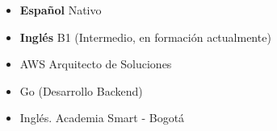 %
%
%

\twocolumnsection
{
\vspace{1em}
\begin{itemize}
	\item \textbf{Español} Nativo
	\item \textbf{Inglés} B1 (Intermedio, en formación actualmente)
\end{itemize}
}
{
\vspace{1em}
\begin{itemize}
	\item AWS Arquitecto de Soluciones
	\item Go (Desarrollo Backend)
	\item Inglés. Academia Smart - Bogotá 
\end{itemize}
}

